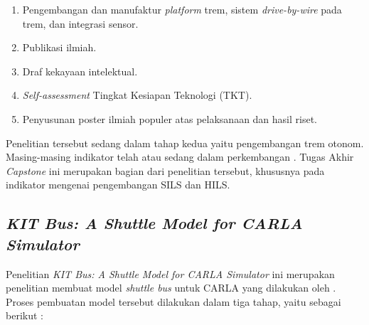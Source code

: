 \begin{enumerate}
    \item Pengembangan dan manufaktur \textit{platform} trem, sistem
    \textit{drive-by-wire} pada trem, dan integrasi sensor.

    \item Publikasi ilmiah.
    \item Draf kekayaan intelektual.
    \item \textit{Self-assessment} Tingkat Kesiapan Teknologi (TKT).
    \item Penyusunan poster ilmiah populer atas pelaksanaan dan hasil riset.

\end{enumerate}

Penelitian tersebut sedang dalam tahap kedua yaitu pengembangan trem otonom.
Masing-masing indikator telah atau sedang dalam perkembangan
\parencite{rispro-trilaksono}. Tugas Akhir \textit{Capstone} ini merupakan
bagian dari penelitian tersebut, khususnya pada indikator mengenai pengembangan
SILS dan HILS.

\subsection{\textit{KIT Bus: A Shuttle Model for CARLA Simulator}}

Penelitian \textit{KIT Bus: A Shuttle Model for CARLA Simulator} ini merupakan
penelitian membuat model \textit{shuttle bus} untuk CARLA yang dilakukan oleh
\cite{related-work-xiang}. Proses pembuatan model tersebut dilakukan dalam tiga
tahap, yaitu sebagai berikut \parencite{related-work-xiang}:

